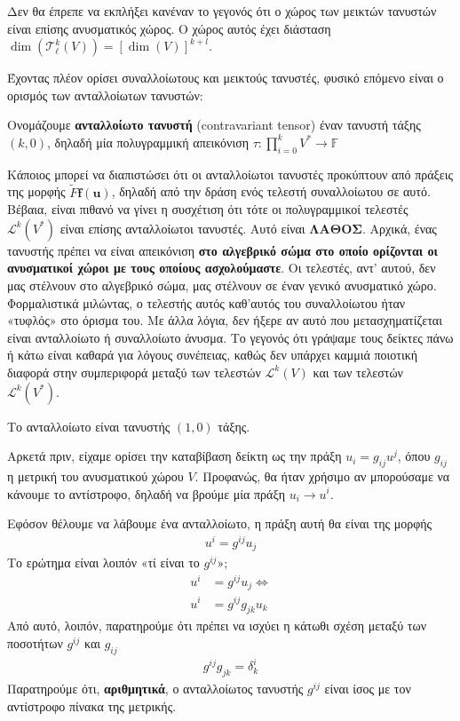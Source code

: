 \documentclass[main.tex]{subfiles}
\begin{document}
	Δεν θα έπρεπε να εκπλήξει κανέναν το γεγονός ότι ο χώρος των μεικτών τανυστών είναι επίσης ανυσματικός χώρος. Ο χώρος αυτός έχει διάσταση $\dim(\mathcal{T}^k_\ell(V)) = [\dim(V)]^{k+l}$.
	
	Έχοντας πλέον ορίσει συναλλοίωτους και μεικτούς τανυστές, φυσικό επόμενο είναι ο ορισμός των ανταλλοίωτων τανυστών:
	\begin{definition}
		Ονομάζουμε \textbf{ανταλλοίωτο τανυστή} (contravariant tensor) έναν τανυστή τάξης $(k,0)$, δηλαδή μία πολυγραμμική απεικόνιση $\tau:\prod_{i=0}^kV^*\rightarrow \mathbb{F}$
	\end{definition}
	Κάποιος μπορεί να διαπιστώσει ότι οι ανταλλοίωτοι τανυστές προκύπτουν από πράξεις της μορφής $\tilde{F}\boldsymbol{f}(\boldsymbol{u})$, δηλαδή από την δράση ενός τελεστή συναλλοίωτου σε αυτό. Βέβαια, είναι πιθανό να γίνει η συσχέτιση ότι τότε οι πολυγραμμικοί τελεστές $\mathcal{L}^k(V^*)$ είναι επίσης ανταλλοίωτοι τανυστές. Αυτό είναι \textbf{ΛΑΘΟΣ}. Αρχικά, ένας τανυστής πρέπει να είναι απεικόνιση \textbf{στο αλγεβρικό σώμα στο οποίο ορίζονται οι ανυσματικοί χώροι με τους οποίους ασχολούμαστε}. Οι τελεστές, αντ' αυτού, δεν μας στέλνουν στο αλγεβρικό σώμα, μας στέλνουν σε έναν γενικό ανυσματικό χώρο. Φορμαλιστικά μιλώντας, ο τελεστής αυτός καθ'αυτός του συναλλοίωτου ήταν «τυφλός» στο όρισμα του. Με άλλα λόγια, δεν ήξερε αν αυτό που μετασχηματίζεται είναι ανταλλοίωτο ή συναλλοίωτο άνυσμα. Το γεγονός ότι γράψαμε τους δείκτες πάνω ή κάτω είναι καθαρά για λόγους συνέπειας, καθώς δεν υπάρχει καμμιά ποιοτική διαφορά στην συμπεριφορά μεταξύ των τελεστών $\mathcal{L}^k(V)$ και των τελεστών $\mathcal{L}^k(V^*)$.
	
	\begin{corollary}
		Το ανταλλοίωτο είναι τανυστής $(1,0)$ τάξης.
	\end{corollary}

	Αρκετά πριν, είχαμε ορίσει την καταβίβαση δείκτη ως την πράξη $u_i = g_{ij}u^j$, όπου $g_{ij}$ η μετρική του ανυσματικού χώρου $V$. Προφανώς, θα ήταν χρήσιμο αν μπορούσαμε να κάνουμε το αντίστροφο, δηλαδή να βρούμε μία πράξη $u_i \rightarrow u^i$.
	
	Εφόσον θέλουμε να λάβουμε ένα ανταλλοίωτο, η πράξη αυτή θα είναι της μορφής
	\begin{align*}
		u^i = g^{ij}u_j
	\end{align*}
	Το ερώτημα είναι λοιπόν «τί είναι το $g^{ij}$»;
	\begin{align*}
		u^i &= g^{ij}u_j \Leftrightarrow\\
		u^i &= g^{ij}g_{jk}u_k
	\end{align*}
	Από αυτό, λοιπόν, παρατηρούμε ότι πρέπει να ισχύει η κάτωθι σχέση μεταξύ των ποσοτήτων $g^{ij}$ και $g_{ij}$
	\begin{align*}
		g^{ij}g_{jk} = \delta^i_k
	\end{align*}
	Παρατηρούμε ότι, \textbf{αριθμητικά}, ο ανταλλοίωτος τανυστής $g^{ij}$ είναι ίσος με τον αντίστροφο πίνακα της μετρικής.
	
\end{document}
